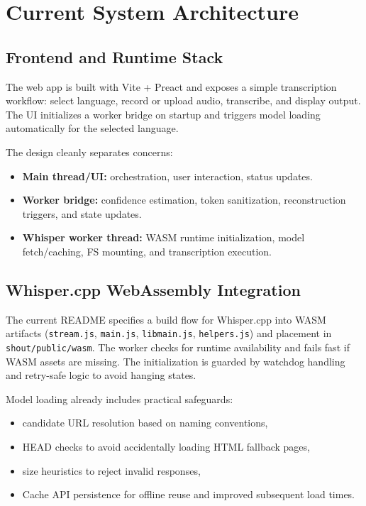 \documentclass[11pt]{article}
\begin{document}
\section{Current System Architecture}
\subsection{Frontend and Runtime Stack}
The web app is built with Vite + Preact and exposes a simple transcription workflow: select language, record or upload audio, transcribe, and display output. The UI initializes a worker bridge on startup and triggers model loading automatically for the selected language.

The design cleanly separates concerns:
\begin{itemize}[leftmargin=1.3em]
    \item \textbf{Main thread/UI:} orchestration, user interaction, status updates.
    \item \textbf{Worker bridge:} confidence estimation, token sanitization, reconstruction triggers, and state updates.
    \item \textbf{Whisper worker thread:} WASM runtime initialization, model fetch/caching, FS mounting, and transcription execution.
\end{itemize}

\subsection{Whisper.cpp WebAssembly Integration}
The current README specifies a build flow for Whisper.cpp into WASM artifacts (\texttt{stream.js}, \texttt{main.js}, \texttt{libmain.js}, \texttt{helpers.js}) and placement in \texttt{shout/public/wasm}. The worker checks for runtime availability and fails fast if WASM assets are missing. The initialization is guarded by watchdog handling and retry-safe logic to avoid hanging states.

Model loading already includes practical safeguards:
\begin{itemize}[leftmargin=1.3em]
    \item candidate URL resolution based on naming conventions,
    \item HEAD checks to avoid accidentally loading HTML fallback pages,
    \item size heuristics to reject invalid responses,
    \item Cache API persistence for offline reuse and improved subsequent load times.
\end{itemize}
\end{document}
